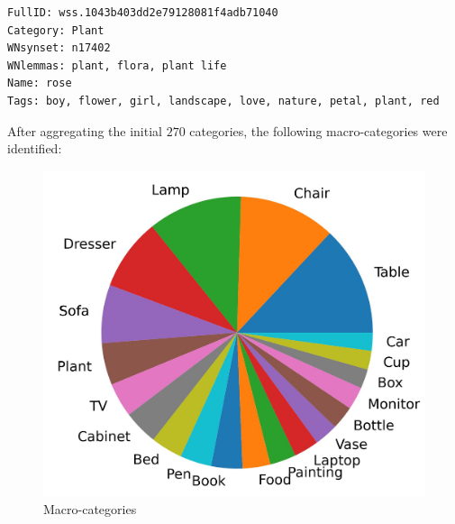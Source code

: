 \documentclass[11pt,a4paper]{article}
\begin{document}
\begin{figure}[H]
    \centering
\end{figure}
\begin{lstlisting}[language=bash,frame=single,caption={Random sample from the dataset},captionpos=b]
FullID: wss.1043b403dd2e79128081f4adb71040
Category: Plant
WNsynset: n17402
WNlemmas: plant, flora, plant life
Name: rose
Tags: boy, flower, girl, landscape, love, nature, petal, plant, red
\end{lstlisting}
After aggregating the initial $270$ categories, the following macro-categories were identified:
\begin{figure}[H]
    \centering
    \includegraphics[scale=0.50]{imgs/macro-categories.jpg}
    \caption{Macro-categories}
\end{figure}
\end{document}
